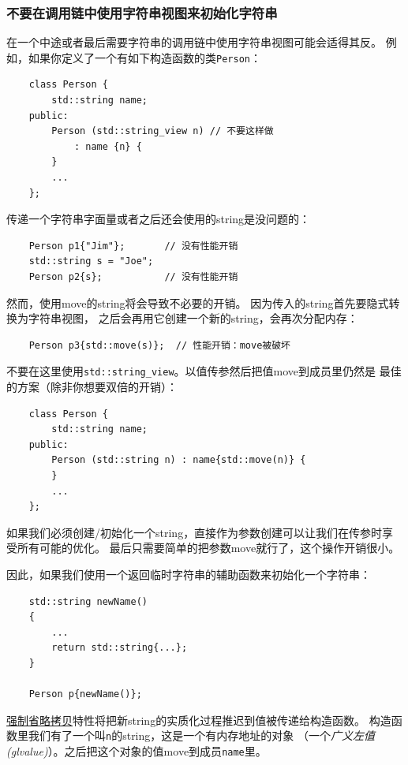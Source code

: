 \subsubsection{不要在调用链中使用字符串视图来初始化字符串}
在一个中途或者最后需要字符串的调用链中使用字符串视图可能会适得其反。
例如，如果你定义了一个有如下构造函数的类\texttt{Person}：
\begin{lstlisting}
    class Person {
        std::string name;
    public:
        Person (std::string_view n) // 不要这样做
            : name {n} {
        }
        ...
    };
\end{lstlisting}
传递一个字符串字面量或者之后还会使用的string是没问题的：
\begin{lstlisting}
    Person p1{"Jim"};       // 没有性能开销
    std::string s = "Joe";
    Person p2{s};           // 没有性能开销
\end{lstlisting}
然而，使用move的string将会导致不必要的开销。
因为传入的string首先要隐式转换为字符串视图，
之后会再用它创建一个新的string，会再次分配内存：
\begin{lstlisting}
    Person p3{std::move(s)};  // 性能开销：move被破坏
\end{lstlisting}
不要在这里使用\texttt{std::string\_view}。以值传参然后把值move到成员里仍然是
最佳的方案（除非你想要双倍的开销）：
\begin{lstlisting}
    class Person {
        std::string name;
    public:
        Person (std::string n) : name{std::move(n)} {
        }
        ...
    };
\end{lstlisting}
如果我们必须创建/初始化一个string，直接作为参数创建可以让我们在传参时享受所有可能的优化。
最后只需要简单的把参数move就行了，这个操作开销很小。

因此，如果我们使用一个返回临时字符串的辅助函数来初始化一个字符串：
\begin{lstlisting}
    std::string newName()
    {
        ...
        return std::string{...};
    }

    Person p{newName()};
\end{lstlisting}
\hyperref[ch5]{强制省略拷贝}特性将把新string的实质化过程推迟到值被传递给构造函数。
构造函数里我们有了一个叫\texttt{n}的string，这是一个有内存地址的对象
（一个\emph{广义左值(glvalue)}）。之后把这个对象的值move到成员\texttt{name}里。

